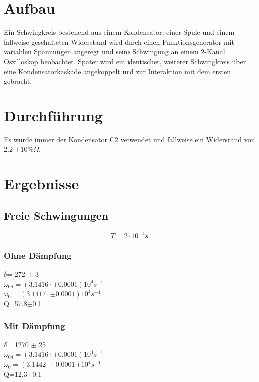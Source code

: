 \documentclass{article}
\begin{document}
\section{Aufbau}
Ein Schwingkreis bestehend aus einem Kondensator, einer Spule und einem fallweise geschalteten Widerstand wird durch einen Funktionsgenerator mit variablen Spannungen angeregt und seine Schwingung an einem 2-Kanal Oszilloskop beobachtet. Später wird ein identischer, weiterer Schwingkreis über eine Kondensatorkaskade angekoppelt und zur Interaktion mit dem ersten gebracht.
\section{Durchführung}
Es wurde immer der Kondensator C2 verwendet und fallweise ein Widerstand von 2.2 $\pm 10\% \Omega$.
\section{Ergebnisse}
\subsection{Freie Schwingungen}
$$T=2 \cdot 10^{-4}s$$
\subsubsection*{Ohne Dämpfung}
\begin{center}
$\delta$= 272 $\pm$ 3\\
$\omega_{0d}=(3.1416\cdot \pm 0.0001)10^4 s^{-1}$\\
$\omega_{0}=(3.1417\cdot \pm 0.0001)10^4 s^{-1}$\\
Q=57.8$\pm$0.1\\
\end{center}
\subsubsection*{Mit Dämpfung}
\begin{center}
$\delta$= 1270 $\pm$ 25\\
$\omega_{0d}=(3.1416\cdot \pm 0.0001)10^4 s^{-1}$\\
$\omega_{0}=(3.1442\cdot \pm 0.0001)10^4 s^{-1}$ \\
Q=12.3$\pm$0.1\\
\end{center}
\end{document}
